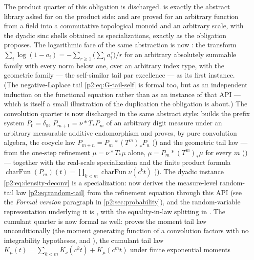 \documentclass[11pt,oneside]{article}
\numberwithin{equation}{section}
\theoremstyle{definition}
\theoremstyle{remark}
\begin{document}
The product quarter of this obligation is discharged.  
is exactly the abstract library asked for on the product side:
 and  are proved for an
arbitrary function from a field into a commutative topological monoid and an arbitrary scale,
with the dyadic sinc shells obtained as specializations, exactly as the obligation proposes.
The logarithmic face of the same abstraction is now : the
transform $\sum_i\log(1-a_i)=-\sum_{r\ge1}\bigl(\sum_ia_i^r\bigr)/r$ for an arbitrary
absolutely summable family with every norm below one, over an arbitrary index type, with the
geometric family --- the self-similar tail par excellence --- as its first instance.
(The negative-Laplace tail \eqref{p2:eq:G-tail-self} is formal too, but as an independent
induction on the functional equation rather than as an instance of that API --- which is
itself a small illustration of the duplication the obligation is about.)  The convolution
quarter is now discharged in the same abstract style:
 builds the prefix system \(P_0=\delta_0\),
\(P_{m+1}=\nu\ast T_*P_m\) of an arbitrary digit measure under an arbitrary measurable
additive endomorphism and proves, by pure convolution algebra, the cocycle law
\(P_{m+n}=P_m\ast(T^m)_*P_n\) () and the geometric tail
law --- from the one-step refinement \(\mu=\nu\ast T_*\mu\) alone, \(\mu=P_m\ast(T^m)_*\mu\)
for every \(m\) () --- together with the
real-scale specialization and the finite product formula
\(\operatorname{charFun}(P_m)(t)=\prod_{k<m}\operatorname{charFun}\nu(c^kt)\)
().  The dyadic instance \eqref{p2:eq:density-deconv}
is a specialization:  now derives the measure-level
random-tail law \eqref{p2:eq:random-tail} from the refinement equation through this API
(see the \emph{Formal version} paragraph in \cref{p2:sec:probability}), and the
random-variable representation underlying it is ,
with the equality-in-law splitting in .  The cumulant
quarter is now formal as well:  proves the moment tail law
unconditionally (the moment generating function of a convolution factors with no
integrability hypotheses,  and
), the cumulant tail law
\(K_\mu(t)=\sum_{k<m}K_\nu(c^kt)+K_\mu(c^mt)\) under finite exponential moments
\end{document}
